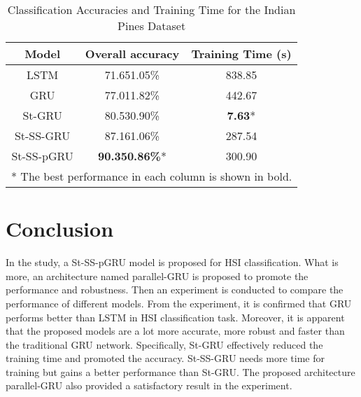 \documentclass[conference]{IEEEtran}
\begin{document}
    \begin{table}[htbp]
    \caption{Classification Accuracies and Training Time for the Indian Pines Dataset}
    \begin{center}
    \begin{tabular}{c|cc}
    \hline
    \hline
    \textbf{Model} & \textbf{Overall accuracy} & \textbf{Training Time (s)}    \\
    \hline
    LSTM           & 71.651.05\%               & 838.85                   \\
    GRU            & 77.011.82\%               & 442.67                   \\
    St-GRU         & 80.530.90\%               & \textbf{7.63}*           \\
    St-SS-GRU      & 87.161.06\%               & 287.54                   \\
    St-SS-pGRU     & \textbf{90.350.86\%}*     & 300.90                   \\
    \hline
    \hline
    \multicolumn{3}{l}{* The best performance in each column is shown in bold.}\\
    \end{tabular}
    \end{center}
    \label{tab:ipaac}
    \end{table}



\section{Conclusion }

In the study, a St-SS-pGRU model is proposed for HSI classification. What is more,
an architecture named parallel-GRU is proposed to promote the performance and
robustness. Then an experiment is conducted to compare the performance of different
models. From the experiment, it is confirmed that GRU performs better than LSTM in
HSI classification task. Moreover, it is apparent that the proposed models are a lot
more accurate, more robust and faster than the traditional GRU network. Specifically,
St-GRU effectively reduced the training time and promoted the accuracy. St-SS-GRU
needs more time for training but gains a better performance than St-GRU. The proposed
architecture parallel-GRU also provided a satisfactory result in the experiment.


















\vspace{12pt}
\end{document}
